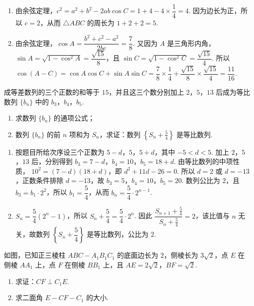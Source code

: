 \begin{solution}
\begin{enumerate}
\item 由余弦定理，\(c^2=a^2+b^2-2ab\cos C=1+4-4\times\dfrac14=4\). 因为边长为正，所以 \(c=2\)，从而 \(\triangle ABC\) 的周长为 \(1+2+2=5\).
\item 由余弦定理，\(\cos A=\dfrac{b^2+c^2-a^2}{2bc}=\dfrac78\). 又因为 \(A\) 是三角形内角，\(\sin A=\sqrt{1-\cos^2A}=\dfrac{\sqrt{15}}8\)，且 \(\sin C=\sqrt{1-\cos^2C}=\dfrac{\sqrt{15}}4\). 所以
\(\cos(A-C)=\cos A\cos C+\sin A\sin C=\dfrac78\times\dfrac14+\dfrac{\sqrt{15}}8\times\dfrac{\sqrt{15}}4=\dfrac{11}{16}\).
\end{enumerate}
\end{solution}

\begin{problem}
成等差数列的三个正数的和等于 \(15\)，并且这三个数分别加上 \(2\)，\(5\)，\(13\) 后成为等比数列 \(\{b_n\}\) 中的 \(b_3\)，\(b_4\)，\(b_5\).
\begin{enumerate}
\item 求数列 \( \{b_{n}\} \) 的通项公式；
\item 数列 \( \{b_{n}\} \) 的前 \(n\) 项和为 \( S_{n} \)，求证：数列 \( \left\{S_{n}+\frac{5}{4}\right\} \) 是等比数列.
\end{enumerate}
\end{problem}

\begin{solution}
\begin{enumerate}
\item 按题目所给次序设三个正数为 \(5-d\)，\(5\)，\(5+d\)，其中 \(-5<d<5\). 加上 \(2\)，\(5\)，\(13\) 后，分别得到 \(b_3=7-d\)，\(b_4=10\)，\(b_5=18+d\). 由等比数列的中项性质，
\(10^2=(7-d)(18+d)\)，即 \(d^2+11d-26=0\). 所以 \(d=2\) 或 \(d=-13\)，正数条件排除 \(d=-13\)，故 \(b_3=5\)，\(b_4=10\)，\(b_5=20\). 数列公比为 \(2\)，且 \(b_3=b_1\cdot2^2\)，所以 \(b_1=\dfrac54\)，从而
\(b_n=\dfrac54\cdot2^{n-1}\).
\item \(S_n=\dfrac54\left(2^n-1\right)\)，所以
\(S_n+\dfrac54=\dfrac54\cdot2^n\). 因此
\(\dfrac{S_{n+1}+\frac54}{S_n+\frac54}=2\)，该比值与 \(n\) 无关，故数列 \(\left\{S_n+\dfrac54\right\}\) 是等比数列，公比为 \(2\).
\end{enumerate}
\end{solution}

\begin{problem}
如图，已知正三棱柱 \(ABC - A_{1}B_{1}C_{1}\) 的底面边长为 \(2\)，侧棱长为 \(3\sqrt{2}\)，点 \(E\) 在侧棱 \(AA_{1}\) 上，点 \(F\) 在侧棱 \(BB_{1}\) 上，且 \(AE = 2\sqrt{2}\)，\(BF = \sqrt{2}\).

\begin{enumerate}
\item 求证：\(CF \perp C_{1}E\).
\item 求二面角 \(E - CF - C_1\) 的大小.
\end{enumerate}

\end{problem}

